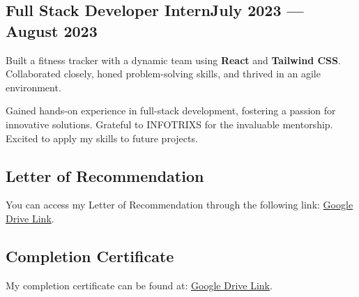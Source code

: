 \subsection{{Full Stack Developer Intern\hfill July 2023 --- August 2023}}
\begin{zitemize}
    \item Built a fitness tracker with a dynamic team using \textbf{React} and \textbf{Tailwind CSS}. Collaborated closely, honed problem-solving skills, and thrived in an agile environment. 
    \item Gained hands-on experience in full-stack development, fostering a passion for innovative solutions. Grateful to INFOTRIXS for the invaluable mentorship. Excited to apply my skills to future projects.

\subsection{{Letter of Recommendation}}
You can access my Letter of Recommendation through the following link: \href{https://drive.google.com/file/d/1CgP45vZIpdOrJJdlWFLo5sY55WQj5FiL/view?usp=drivesdk}{Google Drive Link}.

\subsection{{Completion Certificate}}
My completion certificate can be found at: \href{https://drive.google.com/file/d/1DF9omNonCkAQRWrWYLqhWcF5RD2DxaC6/view?usp=drivesdk}{Google Drive Link}.

\end{zitemize}


